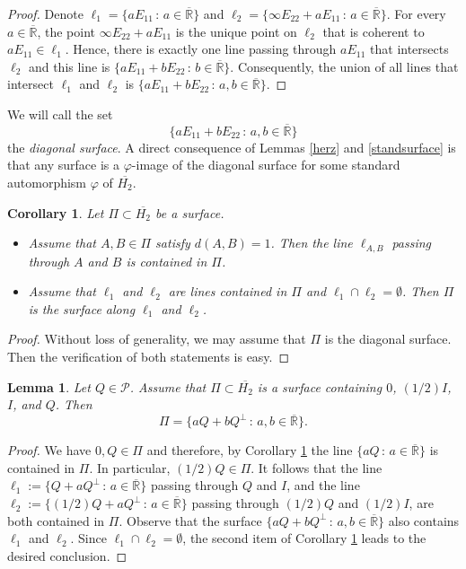 \documentclass[10pt]{amsart}
\newtheorem{lemma}[theorem]{Lemma}
\newtheorem{corollary}[theorem]{Corollary}
\theoremstyle{definition}
\theoremstyle{remark}
\numberwithin{subsection}{section}
\numberwithin{equation}{section}
\newcommand\oH{{\overline{H_2}}}
\newcommand\oR{{\overline{\mathbb{R}}}}
\begin{document}
\begin{proof}
Denote $\ell_1 = \{ a E_{11} \, : \, a \in {\oR} \}$ and $\ell_2 = \{  \infty E_{22}  + a E_{11} \, : \, a \in {\oR} \}$.
For every $a \in {\oR}$, the point $\infty E_{22}  + a E_{11}$ is the unique point on $\ell_2$ that is coherent to $aE_{11} \in \ell_1$. Hence, there is exactly one line passing through $aE_{11}$ that intersects $\ell_2$ and this line is $\{ a E_{11} + b E_{22} \, : \, b \in {\oR} \}$. Consequently, the union of all lines that intersect  $\ell_1$ and $\ell_2$ is
$\{ a E_{11} + b E_{22} \, : \, a,b \in {\oR} \}$.
\end{proof}

We will call the set 
\begin{equation}\label{ds}
\{ a E_{11} + b E_{22} \, : \, a,b \in {\oR} \}
\end{equation}
the \emph{diagonal surface}.
A direct consequence of Lemmas \ref{herz} and \ref{standsurface} is that any surface is a $\varphi$-image of the diagonal surface for some standard automorphism $\varphi$ of $\oH$.

\begin{corollary}\label{ilja}
Let $\Pi \subset \oH$ be a surface. 
\begin{itemize}
\item Assume that $A,B \in \Pi$ satisfy $d(A,B) = 1$. Then the line $\ell_{A, B}$ passing through $A$ and $B$ is contained in $\Pi$. 
\item Assume that $\ell_1$ and $\ell_2$ are lines contained in $\Pi$ and $\ell_1 \cap \ell_2 = \emptyset$. Then $\Pi$ is the surface along $\ell_1$ and $\ell_2$.
\end{itemize}
\end{corollary}

\begin{proof}
Without loss of generality, we may assume that $\Pi$ is the diagonal surface. Then the verification of both statements is easy.
\end{proof}



\begin{lemma}\label{svinj}
Let $Q \in \mathcal{P}$. Assume that $\Pi \subset \oH$ is a surface containing $0$, $(1/2)I$, $I$, and $Q$. Then
\[
\Pi = \{ a Q + b Q^\perp \, : \, a,b \in {\oR} \}.
\]
\end{lemma}

\begin{proof}
We have $0,Q \in \Pi$ and therefore, by Corollary \ref{ilja} the line $\{ a Q  \, : \, a \in {\oR} \}$ is contained in $\Pi$. In particular, $(1/2)Q\in \Pi$. 
It follows that the line $\ell_1 := \{Q+aQ^\perp\,:\, a\in {\oR}\}$ passing through $Q$ and $I$, and the line $\ell_2 := \{(1/2)Q+aQ^\perp\,:\, a\in {\oR}\}$ passing through $(1/2)Q$ and $(1/2)I$, are both contained in $\Pi$. 
Observe that the surface $\{ a Q + b Q^\perp \, : \, a,b \in {\oR} \}$ also contains $\ell_1$ and $\ell_2$.
Since $\ell_1\cap \ell_2=\emptyset$, the second item of Corollary \ref{ilja} leads to the desired conclusion.
\end{proof}
\end{document}
